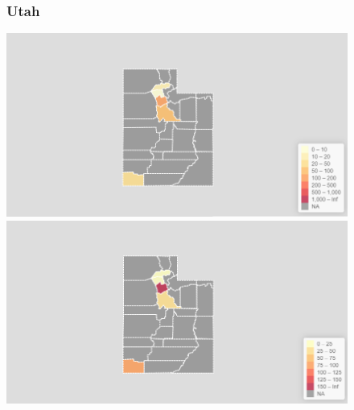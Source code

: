 \documentclass[11pt]{article}
\begin{document}
\begin{landscape}
\begin{figure}[h]
\subsubsection*{Utah}
\vfill
\hspace*{-3cm}
\begin{minipage}{.8\textwidth}
    \includegraphics[width=.95\textwidth]{ImageResults/UtahTotal.PNG}
\end{minipage}%
\begin{minipage}{.8\textwidth}
    \includegraphics[width=.95\textwidth]{ImageResults/Utah100k.PNG}
\end{minipage}
\fillandplacepagenumber
\end{figure}
\end{landscape}
\end{document}
